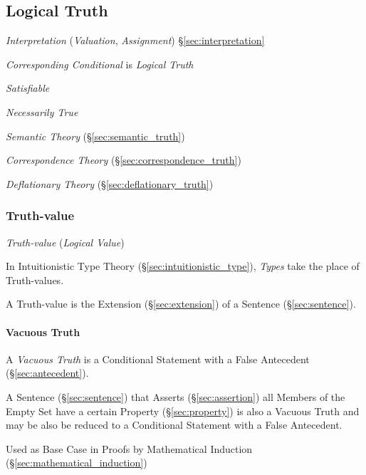 \subsection{Logical Truth}\label{sec:logical_truth}

\emph{Interpretation} (\emph{Valuation}, \emph{Assignment})
\S\ref{sec:interpretation}

\emph{Corresponding Conditional} is \emph{Logical Truth}

\emph{Satisfiable}

\emph{Necessarily True}

\emph{Semantic Theory} (\S\ref{sec:semantic_truth})

\emph{Correspondence Theory} (\S\ref{sec:correspondence_truth})

\emph{Deflationary Theory} (\S\ref{sec:deflationary_truth})



\subsubsection{Truth-value}\label{sec:truth_value}

\emph{Truth-value} (\emph{Logical Value})

In Intuitionistic Type Theory (\S\ref{sec:intuitionistic_type}),
\emph{Types} take the place of Truth-values.

A Truth-value is the Extension (\S\ref{sec:extension}) of a Sentence
(\S\ref{sec:sentence}).



\paragraph{Vacuous Truth}\label{sec:vacuous_truth}\hfill

A \emph{Vacuous Truth} is a Conditional Statement with a False
Antecedent (\S\ref{sec:antecedent}).

A Sentence (\S\ref{sec:sentence}) that Asserts (\S\ref{sec:assertion})
all Members of the Empty Set have a certain Property
(\S\ref{sec:property}) is also a Vacuous Truth and may be also be
reduced to a Conditional Statement with a False Antecedent.

Used as Base Case in Proofs by Mathematical Induction
(\S\ref{sec:mathematical_induction})



